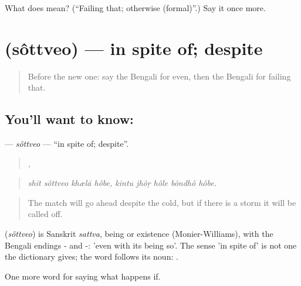 \begin{tcolorbox}[breakable,colback=teal!4,colframe=teal!35!black,title={Before you move on}]
What does  mean? (\textquotedblleft{}Failing that; otherwise (formal)\textquotedblright{}.) Say it once more.
\end{tcolorbox}
\section[\texorpdfstring{\bn{সত্ত্বেও} (sôttveo)}{সত্ত্বেও (sôttveo)}]{ (sôttveo) — in spite of; despite}

\label{lesson:BN-C369-sottveo}



\begin{quote}
Before the new one: say the Bengali for even, then the Bengali for failing that.
\end{quote}

\subsection*{You'll want to know: }
\textbf{} — \emph{sôttveo} — \textquotedblleft{}in spite of; despite\textquotedblright{}.

\begin{quote}
   ,     
\end{quote}

\begin{quote}
\emph{shīt sôttveo khælā hôbe, kintu jhôṛ hôle bôndhô hôbe.}
\end{quote}

\begin{quote}
The match will go ahead despite the cold, but if there is a storm it will be called off.
\end{quote}

\begin{cousinweb}
\textbf{} (\emph{sôttveo}) is Sanskrit \emph{sattva}, being or existence (Monier-Williams), with the Bengali endings - and -: 'even with its being so'. The sense 'in spite of' is not one the dictionary gives; the word follows its noun:  .
\end{cousinweb}

\begin{grammarlens}[title={What you've built}]
One more word for saying what happens if.
\end{grammarlens}

